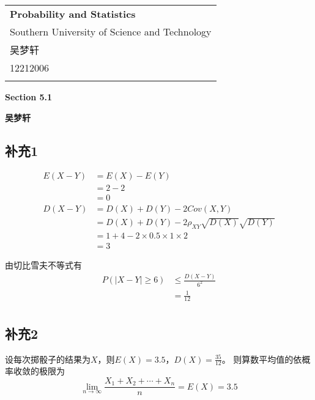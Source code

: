 \documentclass[a4paper,12pt]{ctexart}
\begin{document}
\thispagestyle{empty} %

\begin{tabular}{p{15.5cm}}
{\large \bf Probability and Statistics} \\
Southern University of Science and Technology \\ 吴梦轩 \\ 12212006 \\
\hline
\\
\end{tabular}

\vspace*{0.3cm} %

\begin{center}
	{\Large \bf Section 5.1}
	\vspace{2mm}

	{\bf 吴梦轩}
		
\end{center}  

\vspace{0.4cm}

\subsection*{补充1}

\begin{align*}
	E(X- Y) &= E(X) - E(Y) \\
	&= 2 - 2 \\
	&= 0 \\
	D(X - Y) &= D(X) + D(Y) - 2Cov(X, Y) \\
	&= D(X) + D(Y) - 2 \rho_{XY} \sqrt{D(X)} \sqrt{D(Y)} \\
	&= 1 + 4 - 2 \times 0.5 \times 1 \times 2 \\
	&= 3
\end{align*}

由切比雪夫不等式有
\begin{align*}
	P(|X - Y| \geq 6) &\leq \frac{D(X - Y)}{6^2} \\
	&= \frac{1}{12} \\
\end{align*}

\subsection*{补充2}

设每次掷骰子的结果为$X$，则$E(X) = 3.5$，$D(X) = \frac{35}{12}$。
则算数平均值的依概率收敛的极限为
\begin{equation*}
	\lim_{n \to \infty} \frac{X_1 + X_2 + \cdots + X_n}{n} = E(X) = 3.5
\end{equation*}
\end{document}
